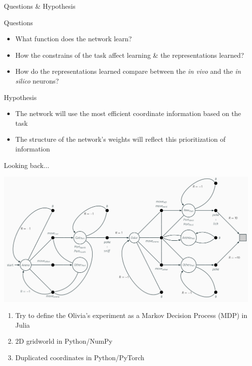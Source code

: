 \documentclass[bigger]{beamer}
\begin{document}
\begin{frame}[label={sec:org8d59d68}]{Questions \& Hypothesis}
\begin{exampleblock}{Questions}
\begin{itemize}
\item What \alert{function} does the network learn?
\item How the constrains of the task affect learning \& the representations learned?
\item How do the representations learned compare between the \emph{in vivo} and the \emph{in silico} neurons?
\end{itemize}
\end{exampleblock}
\pause
\begin{exampleblock}{Hypothesis}
\begin{itemize}
\item The network will use the most efficient coordinate information based on the task
\item The structure of the network's weights will reflect this prioritization of information
\end{itemize}
\end{exampleblock}
\end{frame}
\begin{frame}[label={sec:org07ba994}]{Looking back\(\dots\)}
\footnotesize
\begin{center}
\includegraphics[height=0.5\textheight]{img/mdp.png}
\end{center}
\begin{enumerate}
\item Try to define the Olivia's experiment as a Markov Decision Process (MDP) in Julia
\item 2D gridworld in Python/NumPy
\item Duplicated coordinates in Python/PyTorch
\end{enumerate}
\end{frame}
\end{document}
